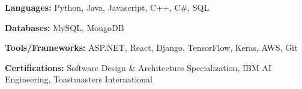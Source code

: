 \begin{siderulesSos}
\begin{skillSection}
\cvskillentry
    {
      \begin{cvsositems}
        \item {\color{black}\textbf{Languages:} Python, Java, Javascript, C++, C\#, SQL}
        \item {\color{black}\textbf{Databases:} MySQL, MongoDB}
        \item {\color{black}\textbf{Tools/Frameworks:} ASP.NET, React, Django, TensorFlow, Keras, AWS, Git}
        \item {\color{black}\textbf{Certifications:} Software Design \& Architecture Specialization, IBM AI Engineering, Toastmasters International}
      \end{cvsositems}
    }
\end{skillSection}
\end{siderulesSos}